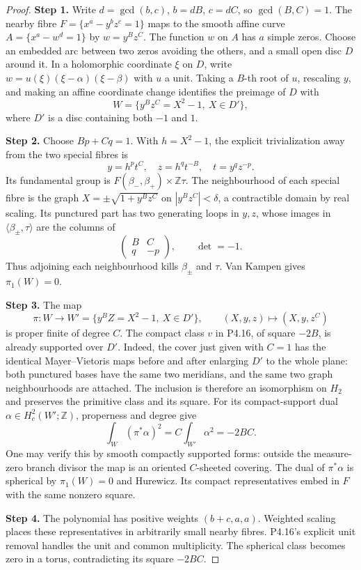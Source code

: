 \begin{proof}
\noindent\textbf{Step 1.} Write $d=\gcd(b,c)$, $b=dB$, $c=dC$, so $\gcd(B,C)=1$.
The nearby fibre $F=\{x^a-y^bz^c=1\}$ maps to the smooth
affine curve $A=\{x^a-w^d=1\}$ by $w=y^Bz^C$.
The function $w$ on $A$ has $a$ simple zeros. Choose an
embedded arc between two zeros avoiding the others, and a
small open disc $D$ around it. In a holomorphic coordinate
$\xi$ on $D$, write $w=u(\xi)(\xi-\alpha)(\xi-\beta)$
with $u$ a unit. Taking a $B$-th root of $u$, rescaling $y$,
and making an affine coordinate change identifies the preimage
of $D$ with
\[
 W=\{y^Bz^C=X^2-1,\ X\in D'\},
\]
where $D'$ is a disc containing both $-1$ and $1$.

\noindent\textbf{Step 2.} Choose $Bp+Cq=1$. With $h=X^2-1$, the explicit trivialization
away from the two special fibres is
\[
 y=h^pt^C,\quad z=h^qt^{-B},\quad t=y^qz^{-p}.
\]
Its fundamental group is $F(\beta_-,\beta_+)\times\mathbb Z\tau$.
The neighbourhood of each special fibre is the graph
$X=\pm\sqrt{1+y^Bz^C}$ on $|y^Bz^C|<\delta$, a contractible
domain by real scaling. Its punctured part has two generating
loops in $y,z$, whose images in $\langle\beta_\pm,\tau\rangle$
are the columns of
\[
 \begin{pmatrix}B&C\\q&-p\end{pmatrix},\qquad \det=-1.
\]
Thus adjoining each neighbourhood kills $\beta_\pm$ and $\tau$.
Van Kampen gives $\pi_1(W)=0$.

\noindent\textbf{Step 3.} The map
\[
 \pi:W\longrightarrow W'=\{y^BZ=X^2-1,\ X\in D'\},
 \qquad (X,y,z)\longmapsto(X,y,z^C)
\]
is proper finite of degree $C$. The compact class $v$ in
P4.16, of square $-2B$, is already supported over $D'$.
Indeed, the cover just given with $C=1$ has the identical
Mayer--Vietoris maps before and after enlarging $D'$ to the
whole plane: both punctured bases have the same two meridians,
and the same two graph neighbourhoods are attached. The
inclusion is therefore an isomorphism on $H_2$ and preserves
the primitive class and its square.
For its compact-support dual $\alpha\in H_c^2(W';\mathbb Z)$,
properness and degree give
\[
 \int_W(\pi^*\alpha)^2=C\int_{W'}\alpha^2=-2BC.
\]
One may verify this by smooth compactly supported forms:
outside the measure-zero branch divisor the map is an oriented
$C$-sheeted covering. The dual of $\pi^*\alpha$ is spherical
by $\pi_1(W)=0$ and Hurewicz. Its compact representatives
embed in $F$ with the same nonzero square.

\noindent\textbf{Step 4.} The polynomial has positive weights $(b+c,a,a)$. Weighted
scaling places these representatives in arbitrarily small
nearby fibres. P4.16's explicit unit removal handles the unit
and common multiplicity. The spherical class becomes zero
in a torus, contradicting its square $-2BC$.


\end{proof}

